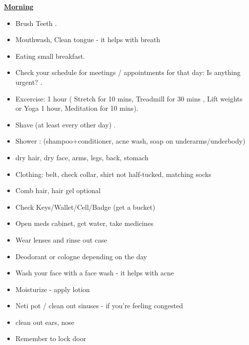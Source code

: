 \underline{\bf Morning}
\begin{itemize}
\tiny \item \tiny Brush Teeth .
\item \tiny Mouthwash, Clean tongue - it helps with breath
\item \tiny Eating small breakfast.
\item \tiny Check your schedule for meetings / appointments for that
day: Is anything urgent? .
\item \tiny Excercise: 1 hour ( Stretch for 10 mins, Treadmill for 30
mins , Lift weights or Yoga 1 hour, Meditation for 10 mins).
\item \tiny Shave (at least every other day) .
\item \tiny Shower : (shampoo+conditioner, acne wash,  soap on
underarms/underbody) 
\item \tiny dry hair, dry face, arms, legs, back, stomach 
\item \tiny Clothing: belt, check collar, shirt not half-tucked,
matching socks 
\item \tiny Comb hair, hair gel optional 
\item \tiny Check Keys/Wallet/Cell/Badge (get a bucket) 
\item \tiny Open meds cabinet, get water, take medicines 
\item \tiny Wear lenses and rinse out case 
\item \tiny Deodorant or cologne depending on the day 
\item \tiny Wash your face with a face wash - it helps with
acne 
\item \tiny Moisturize - apply lotion 
\item \tiny Neti pot / clean out sinuses - if you’re feeling
congested 
\item \tiny clean out ears, nose 
\item \tiny Remember to lock door 
\end{itemize}

